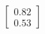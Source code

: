 \documentclass[preview]{standalone}
\begin{document}
\begin{align*}
\begin{bmatrix} 0.82 \\ 0.53 \end{bmatrix}
\end{align*}
\end{document}
